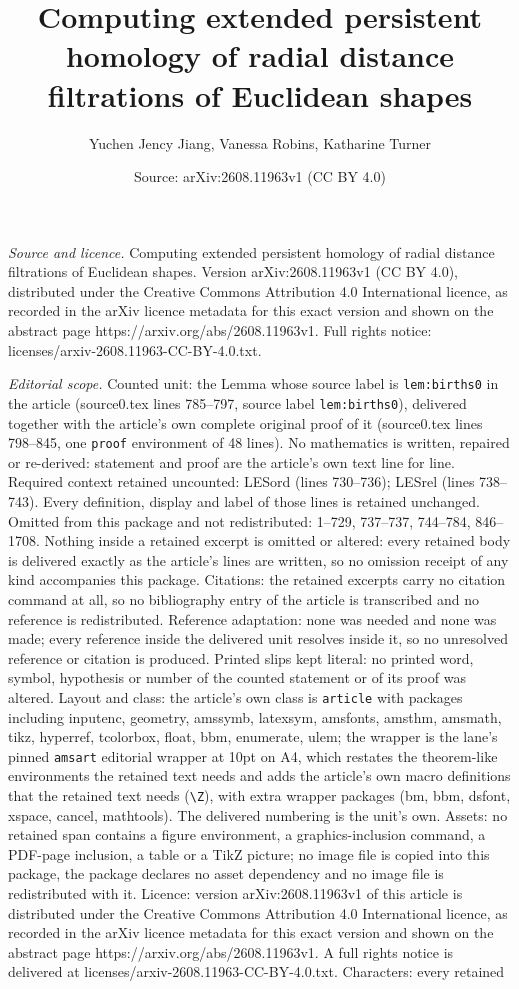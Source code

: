 \documentclass[10pt,a4paper]{amsart}
\title[Computing extended persistent homology of radial distance fi]{Computing extended persistent homology of radial distance filtrations of Euclidean shapes}
\author{Yuchen Jency Jiang, Vanessa Robins, Katharine Turner}
\date{Source: arXiv:2608.11963v1 (CC BY 4.0)}
\begin{document}
\maketitle

\noindent\emph{Source and licence.} Computing extended persistent homology of radial distance filtrations of Euclidean shapes. Version arXiv:2608.11963v1 (CC BY 4.0), distributed under the Creative Commons Attribution 4.0 International licence, as recorded in the arXiv licence metadata for this exact version and shown on the abstract page https://arxiv.org/abs/2608.11963v1. Full rights notice: licenses/arxiv-2608.11963-CC-BY-4.0.txt.\par\smallskip

\noindent\textit{Editorial scope.} Counted unit: the Lemma whose source label is \texttt{lem:births0} in the article (source0.tex lines 785--797, source label \texttt{lem:births0}), delivered together with the article's own complete original proof of it (source0.tex lines 798--845, one \texttt{proof} environment of 48 lines). No mathematics is written, repaired or re-derived: statement and proof are the article's own text line for line. Required context retained uncounted: LESord (lines 730--736); LESrel (lines 738--743). Every definition, display and label of those lines is retained unchanged. Omitted from this package and not redistributed: 1--729, 737--737, 744--784, 846--1708. Nothing inside a retained excerpt is omitted or altered: every retained body is delivered exactly as the article's lines are written, so no omission receipt of any kind accompanies this package. Citations: the retained excerpts carry no citation command at all, so no bibliography entry of the article is transcribed and no reference is redistributed. Reference adaptation: none was needed and none was made; every reference inside the delivered unit resolves inside it, so no unresolved reference or citation is produced. Printed slips kept literal: no printed word, symbol, hypothesis or number of the counted statement or of its proof was altered. Layout and class: the article's own class is \texttt{article} with packages including inputenc, geometry, amssymb, latexsym, amsfonts, amsthm, amsmath, tikz, hyperref, tcolorbox, float, bbm, enumerate, ulem; the wrapper is the lane's pinned \texttt{amsart} editorial wrapper at 10pt on A4, which restates the theorem-like environments the retained text needs and adds the article's own macro definitions that the retained text needs (\texttt{\textbackslash Z}), with extra wrapper packages (bm, bbm, dsfont, xspace, cancel, mathtools). The delivered numbering is the unit's own. Assets: no retained span contains a figure environment, a graphics-inclusion command, a PDF-page inclusion, a table or a TikZ picture; no image file is copied into this package, the package declares no asset dependency and no image file is redistributed with it. Licence: version arXiv:2608.11963v1 of this article is distributed under the Creative Commons Attribution 4.0 International licence, as recorded in the arXiv licence metadata for this exact version and shown on the abstract page https://arxiv.org/abs/2608.11963v1. A full rights notice is delivered at licenses/arxiv-2608.11963-CC-BY-4.0.txt. Characters: every retained 
\end{document}
